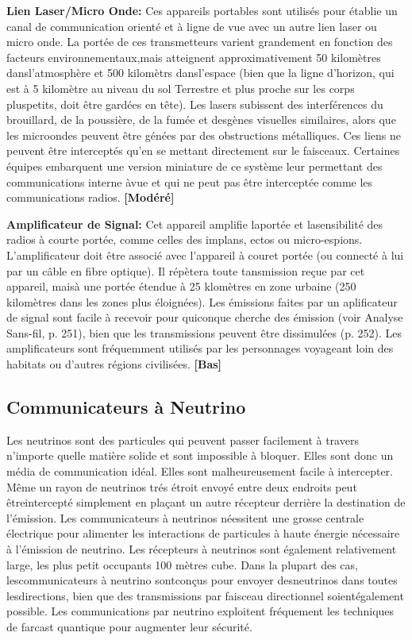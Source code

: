 \textbf{Lien Laser/Micro Onde:} Ces appareils portables sont utilisés pour établie un canal de communication orienté et à ligne de vue avec un autre lien laser ou micro onde. La portée de ces transmetteurs varient grandement en fonction des facteurs environnementaux,mais atteignent approximativement 50 kilomètres dansl'atmosphère et 500 kilomètrs dansl'espace (bien que la ligne d'horizon, qui est à 5 kilomètre au niveau du sol Terrestre et plus proche sur les corps pluspetits, doit être gardées en tête). Les lasers subissent des interférences du brouillard, de la poussière, de la fumée et desgènes visuelles similaires, alors que les microondes peuvent être génées par des obstructions métalliques. Ces liens ne peuvent être interceptés qu'en se mettant directement sur le faisceaux. Certaines équipes embarquent une version miniature de ce système leur permettant des communications interne àvue et qui ne peut pas être interceptée comme les communications radios. \textbf{[Modéré]} 

\textbf{Amplificateur de Signal:} Cet appareil amplifie laportée et lasensibilité des radios à courte portée, comme celles des implans, ectos ou micro-espions. L'amplificateur doit être associé avec l'appareil à couret portée (ou connecté à lui par un câble en fibre optique). Il répètera toute tansmission reçue par cet appareil, maisà une portée étendue à 25 klomètres en zone urbaine (250 kilomètres dans les zones plus éloignées). Les émissions faites par un aplificateur de signal sont facile à recevoir pour quiconque cherche des émission (voir Analyse Sans-fil, p. 251), bien que les transmissions peuvent être dissimulées (p. 252). Les amplificateurs sont fréquemment utilisés par les personnages voyageant loin des habitats ou d'autres régions civilisées. \textbf{[Bas]} 

\subsection{Communicateurs à Neutrino} \label{sec:neutrino-communicators} 

Les neutrinos sont des particules qui peuvent passer facilement à travers n'importe quelle matière solide et sont impossible à bloquer. Elles sont donc un média de communication idéal. Elles sont malheureusement facile à intercepter. Même un rayon de neutrinos trés étroit envoyé entre deux endroits peut êtreintercepté simplement en plaçant un autre récepteur derrière la destination de l'émission. Les communicateurs à neutrinos néessitent une grosse centrale électrique pour alimenter les interactions de particules à haute énergie nécessaire à l'émission de neutrino. Les récepteurs à neutrinos sont également relativement large, les plus petit occupants 100 mètres cube. Dans la plupart des cas, lescommunicateurs à neutrino sontconçus pour envoyer desneutrinos dans toutes lesdirections, bien que des transmissions par faisceau directionnel soientégalement possible. Les communications par neutrino exploitent fréquement les techniques de farcast quantique pour augmenter leur sécurité. 

